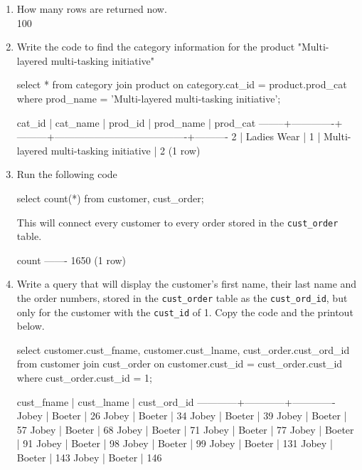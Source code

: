 \begin{enumerate}
\begin{pseudo*}
(100 rows)
\end{pseudo*}
\item How many rows are returned now.\\
100
\item Write the code to find the category information for the product "Multi-layered multi-tasking initiative"
\begin{sql}
select * from category
join product on category.cat_id = product.prod_cat
where prod_name = 'Multi-layered multi-tasking initiative';
\end{sql}
\begin{pseudo*}
 cat_id |  cat_name   | prod_id |               prod_name                | prod_cat
--------+-------------+---------+----------------------------------------+----------
      2 | Ladies Wear |       1 | Multi-layered multi-tasking initiative |        2
(1 row)
\end{pseudo*}
\item Run the following code
\begin{sql}
select count(*) from customer, cust_order;
\end{sql}
This will connect every customer to every order stored in the \verb|cust_order| table.
\begin{pseudo*}
 count
-------
  1650
(1 row)
\end{pseudo*}
\item Write a query that will display the customer's first name, their last name and the order numbers, stored in the \verb|cust_order| table as the \verb|cust_ord_id|, but only for the customer with the \verb|cust_id| of 1. Copy the code and the printout below. 
\begin{sql}
select customer.cust_fname, customer.cust_lname, cust_order.cust_ord_id from customer
join cust_order on customer.cust_id = cust_order.cust_id
where cust_order.cust_id = 1;
\end{sql}
\begin{pseudo*}
 cust_fname | cust_lname | cust_ord_id
------------+------------+-------------
 Jobey      | Boeter     |          26
 Jobey      | Boeter     |          34
 Jobey      | Boeter     |          39
 Jobey      | Boeter     |          57
 Jobey      | Boeter     |          68
 Jobey      | Boeter     |          71
 Jobey      | Boeter     |          77
 Jobey      | Boeter     |          91
 Jobey      | Boeter     |          98
 Jobey      | Boeter     |          99
 Jobey      | Boeter     |         131
 Jobey      | Boeter     |         143
 Jobey      | Boeter     |         146

\end{pseudo*}
\end{enumerate}

